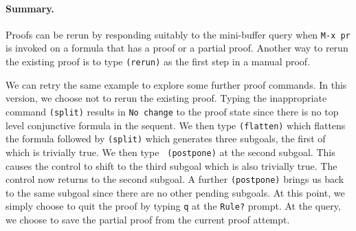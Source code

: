 \paragraph{Summary. }  Proofs can be rerun by responding suitably to the
mini-buffer query when {\tt M-x pr} is invoked on a formula that has a
proof or a partial proof.  Another way to rerun the existing proof is to
type {\tt (rerun)} as the first step in a manual proof.

We can retry the same example to explore some further proof commands.
In this version, we choose not to rerun the existing proof.
Typing the inappropriate command {\tt (split)} results in
{\tt No change} to the proof state since there is no top level
conjunctive formula in the sequent.  We then type {\tt (flatten)} which
flattens the formula followed by {\tt (split)} which generates three
subgoals, the first of which is trivially true.  We then type {\tt
(postpone)} at the second subgoal.  This causes the control to shift to
the third subgoal which is also trivially true.  The control now returns
to the second subgoal.  A further {\tt (postpone)} brings us back to the
same subgoal since there are no other pending subgoals.  At this point,
we simply choose to quit the proof by typing {\tt q} at the {\tt Rule?}
prompt.  At the query, we choose to save the partial proof from the
current proof attempt.  

